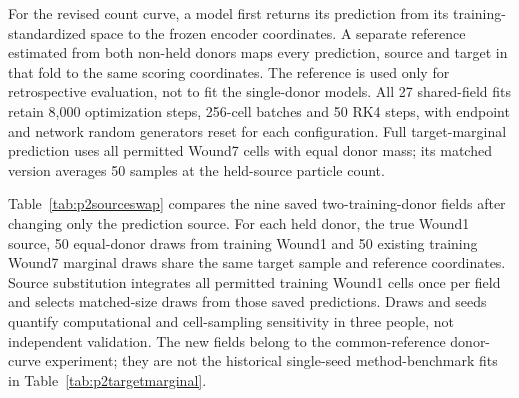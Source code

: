 \documentclass[10pt,a4paper]{article}
\begin{document}
For the revised count curve, a model first returns its prediction from its training-standardized space to the frozen encoder coordinates. A separate reference estimated from both non-held donors maps every prediction, source and target in that fold to the same scoring coordinates. The reference is used only for retrospective evaluation, not to fit the single-donor models. All 27 shared-field fits retain 8,000 optimization steps, 256-cell batches and 50 RK4 steps, with endpoint and network random generators reset for each configuration. Full target-marginal prediction uses all permitted Wound7 cells with equal donor mass; its matched version averages 50 samples at the held-source particle count.

Table~\ref{tab:p2sourceswap} compares the nine saved two-training-donor fields after changing only the prediction source. For each held donor, the true Wound1 source, 50 equal-donor draws from training Wound1 and 50 existing training Wound7 marginal draws share the same target sample and reference coordinates. Source substitution integrates all permitted training Wound1 cells once per field and selects matched-size draws from those saved predictions. Draws and seeds quantify computational and cell-sampling sensitivity in three people, not independent validation. The new fields belong to the common-reference donor-curve experiment; they are not the historical single-seed method-benchmark fits in Table~\ref{tab:p2targetmarginal}.
\end{document}
